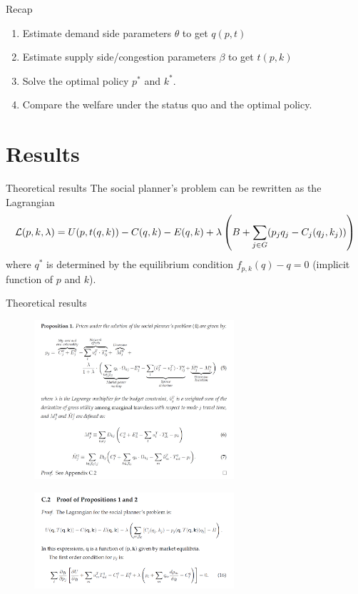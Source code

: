\documentclass[10pt, aspectratio=169]{beamer}
\begin{document}
\begin{frame}{Recap}
  \begin{enumerate}
    \item Estimate demand side parameters $\theta$ to get $q(p,t)$
    \item Estimate supply side/congestion parameters $\beta$ to get $t(p,k)$
    \item Solve the optimal policy $p^*$ and $k^*$.
    \item Compare the welfare under the status quo and the optimal policy.
  \end{enumerate}
\end{frame}
\section{Results}
\begin{frame}{Theoretical results}
  The social planner's problem can be rewritten as the Lagrangian
  \begin{equation*}
    \mathcal{L}(p,k,\lambda)  =U(p,t(q,k))-C(q,k)-E(q,k)+\lambda\left(B+\sum_{j\in G} (p_j q_j - C_j(q_j,k_j))\right)
  \end{equation*}
  where $q^*$ is determined by the equilibrium condition $f_{p,k}(q)-q=0$ (implicit function of $p$ and $k$).
\end{frame}

\begin{frame}{Theoretical results}
  \begin{figure}
    \centering
    \includegraphics[width=0.66\textwidth]{../Figures/proposition1.png}
  \end{figure}
\end{frame}
\begin{frame}
  \begin{figure}
    \centering
    \includegraphics[width=0.66\textwidth]{../Figures/proposition1_proof.png}
  \end{figure}
\end{frame}
\end{document}
